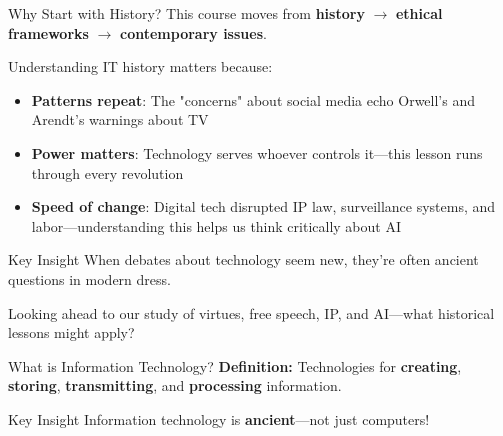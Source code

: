\documentclass[aspectratio=169,11pt]{beamer}
\begin{document}
\begin{frame}{Why Start with History?}
This course moves from \textbf{history} $\rightarrow$ \textbf{ethical frameworks} $\rightarrow$ \textbf{contemporary issues}.

Understanding IT history matters because:
\begin{itemize}
    \item \textbf{Patterns repeat}: The "concerns" about social media echo Orwell's and Arendt's warnings about TV
    \item \textbf{Power matters}: Technology serves whoever controls it---this lesson runs through every revolution
    \item \textbf{Speed of change}: Digital tech disrupted IP law, surveillance systems, and labor---understanding this helps us think critically about AI
\end{itemize}

\vspace{0.2cm}
\begin{exampleblock}{Key Insight}
When debates about technology seem new, they're often ancient questions in modern dress.
\end{exampleblock}

\vspace{0.2cm}
\begin{discussionbox}[Discussion]
Looking ahead to our study of virtues, free speech, IP, and AI---what historical lessons might apply?
\end{discussionbox}
\end{frame}

\begin{frame}{What is Information Technology?}
\textbf{Definition:} Technologies for \textbf{creating}, \textbf{storing}, \textbf{transmitting}, and \textbf{processing} information.

\vspace{0.5em}
\begin{block}{Key Insight}
Information technology is \textbf{ancient}---not just computers!
\end{block}

\vspace{0.3em}
\end{frame}
\end{document}
